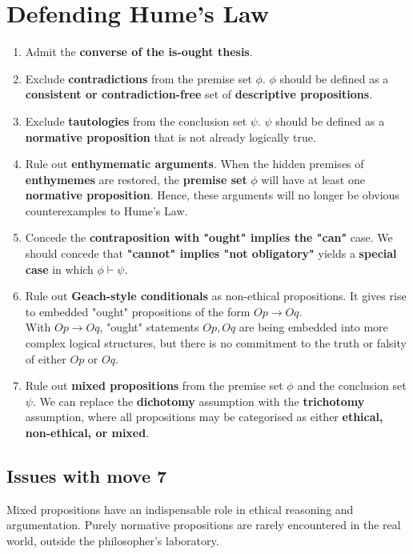 \documentclass[11pt]{article}
\begin{document}
\section{Defending Hume's Law}
\label{sec:org30d7e19}
\begin{enumerate}
\item Admit the \textbf{converse of the is-ought thesis}.
\item Exclude \textbf{contradictions} from the premise set \(\phi\). \(\phi\) should be defined as a \textbf{consistent or contradiction-free} set of \textbf{descriptive propositions}.
\item Exclude \textbf{tautologies} from the conclusion set \(\psi\). \(\psi\) should be defined as a \textbf{normative proposition} that is not already logically true.
\item Rule out \textbf{enthymematic arguments}. When the hidden premises of \textbf{enthymemes} are restored, the \textbf{premise set} \(\phi\) will have at least one \textbf{normative proposition}. Hence, these arguments will no longer be obvious counterexamples to Hume's Law.
\item Concede the \textbf{contraposition with "ought" implies the "can"} case. We should concede that \textbf{"cannot" implies "not obligatory"} yields a \textbf{special case} in which \(\phi \vdash \psi\).
\item Rule out \textbf{Geach-style conditionals} as non-ethical propositions. It gives rise to embedded "ought" propositions of the form \(Op \rightarrow Oq\).  \\

With \(Op \rightarrow Oq\), "ought" statements \(Op, Oq\) are being embedded into more complex logical structures, but there is no commitment to the truth or falsity of either \(Op\) or \(Oq\).
\item Rule out \textbf{mixed propositions} from the premise set \(\phi\) and the conclusion set \(\psi\). We can replace the \textbf{dichotomy} assumption with the \textbf{trichotomy} assumption, where all propositions may be categorised as either \textbf{ethical, non-ethical, or mixed}.
\end{enumerate}

 \newpage
\subsection{Issues with move 7}
\label{sec:org1db7931}
Mixed propositions have an indispensable role in ethical reasoning and argumentation. Purely normative propositions are rarely encountered in the real world, outside the philosopher's laboratory.  \\
\end{document}

